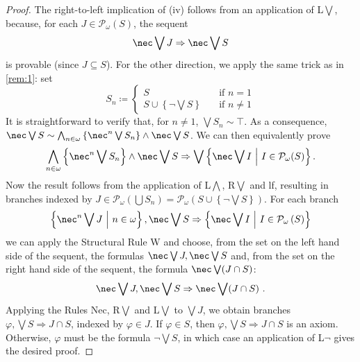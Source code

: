 \documentclass{article}
\theoremstyle{definition}
\begin{document}
\begin{proof}
The right-to-left implication of (iv) follows from an application of L$\bigvee$, because, for each $J \in \mathcal{P}_\omega\left(S\right)$, the sequent
$$\nec \bigvee J \Rightarrow \nec \bigvee S$$
is provable (since $J \subseteq S$). For the other direction, we apply the same trick as in \cref{rem:1}: set
%
\[ S_n \coloneqq
  \begin{cases}
    S       & \quad \text{if } n = 1\\
    S \cup \left\{\neg \bigvee S\right\}  & \quad \text{if } n \neq 1
  \end{cases}
\]
It is straightforward to verify that, for $n \neq 1$, $\bigvee S_n \sim \top$. As a consequence, $\nec \bigvee S \sim \bigwedge_{n \in \omega} \left\{ \nec^n \bigvee S_n \right\} \wedge \nec \bigvee S$. We can then equivalently prove
$$\bigwedge_{n \in \omega} \left\{ \nec^n \bigvee S_n \right\} \wedge \nec \bigvee S \Rightarrow \bigvee \left\{\nec \bigvee I\ \middle\vert\ I \in \mathcal{P}_\omega(S)\right\}.$$
%
Now the result
%
follows from the application of L$\bigwedge$, R$\bigvee$ and lf, resulting in branches indexed by $J \in \mathcal{P}_\omega\left(\bigcup S_n\right) %
= \mathcal{P}_\omega\left(S \cup \left\{\neg \bigvee S\right\}\right)
%
$. For each branch
$$\left\{ \nec^n \bigvee J\ \middle\vert\ n \in \omega\right\}, \nec \bigvee S \Rightarrow \left\{\nec \bigvee I\ \middle\vert\ I \in \mathcal{P}_\omega\left(S\right)\right\}$$
%
we can apply the Structural Rule W and choose,
from the set on the left hand side of the sequent, the formulas $\nec \bigvee J, \nec \bigvee S$ and,
from the set on the right hand side of the sequent, the formula
$\nec \bigvee (J \cap S)$:
$$
\nec \bigvee J, \nec \bigvee S \Rightarrow \nec \bigvee (J \cap S)~.
$$
%
Applying the Rules Nec, R$\bigvee$ and L$\bigvee$ to $\bigvee J$, we obtain branches 
$\varphi, \bigvee S \Rightarrow J \cap S$, 
indexed by $\varphi \in J$. If $\varphi \in S$, then $\varphi, \bigvee S \Rightarrow J \cap S$ is an axiom. Otherwise, $\varphi$ must be the formula $\neg \bigvee S$, in which case an application of L$\neg$ gives the desired proof.

\end{proof}
\end{document}
